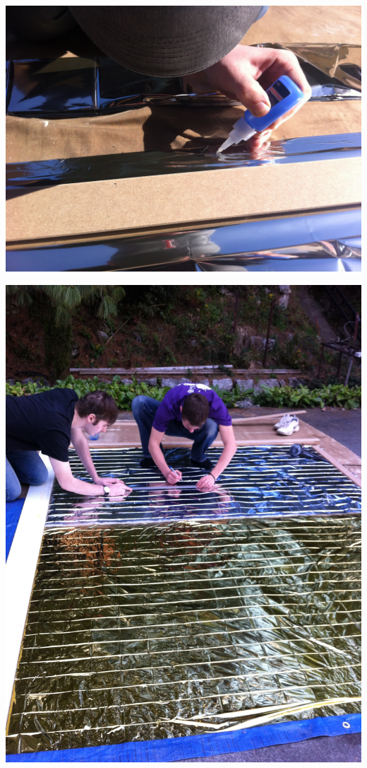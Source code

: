 \documentclass[a4paper,11pt]{article}
\begin{document}
\begin{center}
	\includegraphics[width=15cm]{../Images/assen_1.JPG}
\end{center}
\begin{center}
	\includegraphics[width=15cm]{../Images/assen_2.JPG}
\end{center}
\end{document}
